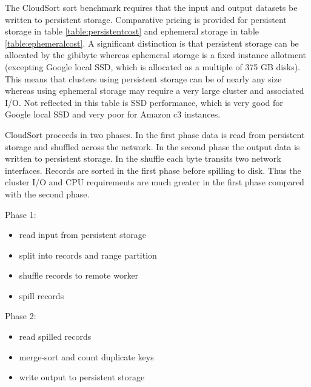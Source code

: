 \documentclass{article}
\begin{document}
The CloudSort sort benchmark requires that the input and output datasets be written to persistent storage. Comparative pricing is provided for persistent storage in table \ref{table:persistentcost} and ephemeral storage in table \ref{table:ephemeralcost}. A significant distinction is that persistent storage can be allocated by the gibibyte whereas ephemeral storage is a fixed instance allotment (excepting Google local SSD, which is allocated as a multiple of 375 GB disks). This means that clusters using persistent storage can be of nearly any size whereas using ephemeral storage may require a very large cluster and associated I/O. Not reflected in this table is SSD performance, which is very good for Google local SSD and very poor for Amazon c3 instances.

CloudSort proceeds in two phases. In the first phase data is read from persistent storage and shuffled across the network. In the second phase the output data is written to persistent storage. In the shuffle each byte transits two network interfaces. Records are sorted in the first phase before spilling to disk. Thus the cluster I/O and CPU requirements are much greater in the first phase compared with the second phase.

Phase 1:
\begin{itemize}  
\item read input from persistent storage
\item split into records and range partition
\item shuffle records to remote worker
\item spill records
\end{itemize}

Phase 2:
\begin{itemize}  
\item read spilled records
\item merge-sort and count duplicate keys
\item write output to persistent storage
\end{itemize}
\end{document}
